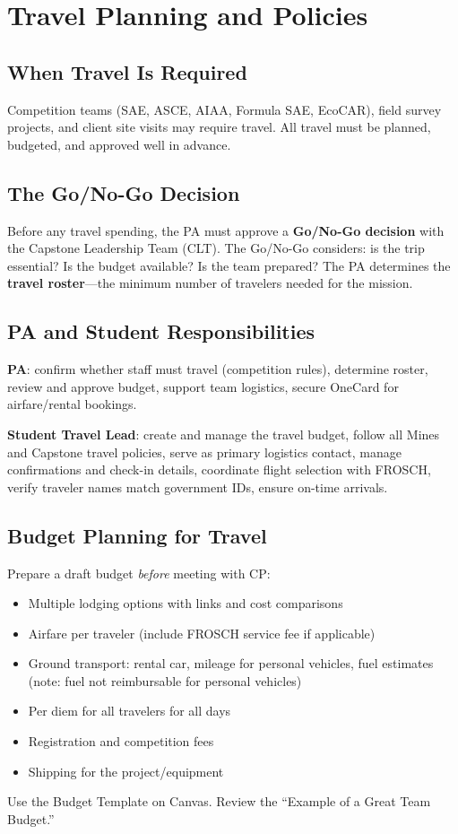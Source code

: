 \chapter{Travel Planning and Policies}

\section{When Travel Is Required}
Competition teams (SAE, ASCE, AIAA, Formula SAE, EcoCAR), field survey projects, and client site visits may require travel. All travel must be planned, budgeted, and approved well in advance.

\section{The Go/No-Go Decision}
Before any travel spending, the PA must approve a \textbf{Go/No-Go decision} with the Capstone Leadership Team (CLT). The Go/No-Go considers: is the trip essential? Is the budget available? Is the team prepared? The PA determines the \textbf{travel roster}---the minimum number of travelers needed for the mission.

\section{PA and Student Responsibilities}
\textbf{PA}: confirm whether staff must travel (competition rules), determine roster, review and approve budget, support team logistics, secure OneCard for airfare/rental bookings.

\textbf{Student Travel Lead}: create and manage the travel budget, follow all Mines and Capstone travel policies, serve as primary logistics contact, manage confirmations and check-in details, coordinate flight selection with FROSCH, verify traveler names match government IDs, ensure on-time arrivals.

\section{Budget Planning for Travel}
Prepare a draft budget \emph{before} meeting with CP:
\begin{itemize}[nosep,leftmargin=1.5em]
\item Multiple lodging options with links and cost comparisons
\item Airfare per traveler (include FROSCH service fee if applicable)
\item Ground transport: rental car, mileage for personal vehicles, fuel estimates (note: fuel not reimbursable for personal vehicles)
\item Per diem for all travelers for all days
\item Registration and competition fees
\item Shipping for the project/equipment
\end{itemize}
Use the Budget Template on Canvas. Review the ``Example of a Great Team Budget.''

